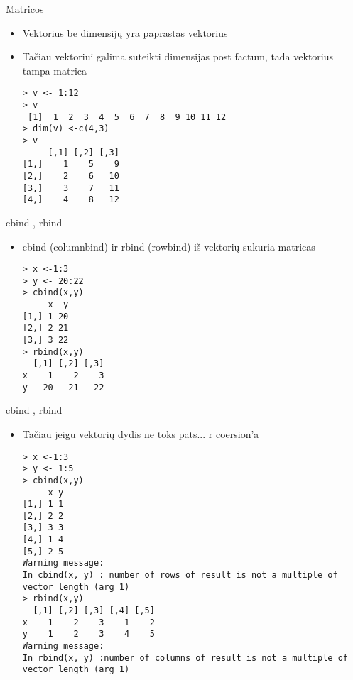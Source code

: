 \documentclass[11pt,xcolor=table]{beamer}
\begin{document}

\begin{frame}[fragile]{Matricos}
\begin{itemize}
\item Vektorius be dimensijų yra paprastas vektorius
\item Tačiau vektoriui galima suteikti dimensijas post factum, tada vektorius tampa matrica
\begin{lstlisting}
> v <- 1:12
> v
 [1]  1  2  3  4  5  6  7  8  9 10 11 12
> dim(v) <-c(4,3)
> v
     [,1] [,2] [,3]
[1,]    1    5    9
[2,]    2    6   10
[3,]    3    7   11
[4,]    4    8   12
\end{lstlisting}
\end{itemize}
\end{frame}


\begin{frame}[fragile]{cbind , rbind}
\begin{itemize}
\item cbind (columnbind) ir rbind (rowbind) iš vektorių sukuria matricas
\begin{lstlisting}
> x <-1:3
> y <- 20:22
> cbind(x,y)
     x  y
[1,] 1 20
[2,] 2 21
[3,] 3 22
> rbind(x,y)
  [,1] [,2] [,3]
x    1    2    3
y   20   21   22
\end{lstlisting}
\end{itemize}
\end{frame}


\begin{frame}[fragile]{cbind , rbind}
\begin{itemize}
\item Tačiau jeigu vektorių dydis ne toks pats... r coersion'a 
\begin{lstlisting}
> x <-1:3
> y <- 1:5
> cbind(x,y)
     x y
[1,] 1 1
[2,] 2 2
[3,] 3 3
[4,] 1 4
[5,] 2 5
Warning message:
In cbind(x, y) : number of rows of result is not a multiple of vector length (arg 1)
> rbind(x,y)
  [,1] [,2] [,3] [,4] [,5]
x    1    2    3    1    2
y    1    2    3    4    5
Warning message:
In rbind(x, y) :number of columns of result is not a multiple of vector length (arg 1)
\end{lstlisting}
\end{itemize}
\end{frame}
\end{document}
